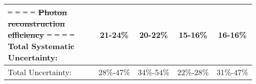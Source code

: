 \documentclass[ALICE,manyauthors]{cernphprep}
\newcommand{\zt}{\ensuremath{z_{\mathrm{T}}}\xspace}
\newcommand{\pPb}          {\mbox{p--Pb}\xspace}
\providecommand{\DIFdeltex}[1]{{\protect\color{red}\sout{#1}}}                      %
\providecommand{\DIFdelFL}[1]{\DIFdel{#1}} %
\providecommand{\DIFdelendFL}{} %
\providecommand{\DIFdel}[1]{\texorpdfstring{\DIFdeltex{#1}}{}} %
\DeclareRobustCommand{\DIFdelendFL}{\DIFOaddendFL \let\includegraphics\DIFOincludegraphics} %
\begin{document}
\begin{table*}
\begin{tabular*}{1.0\textwidth}{@{\extracolsep{\fill}}lcccc@{}}
\DIFdelFL{-- }%
\DIFdelFL{-- }%
\DIFdelFL{-- }%
\DIFdelFL{-- }%
\DIFdelFL{Photon reconstruction efficiency }%
\DIFdelFL{-- }%
\DIFdelFL{-- }%
\DIFdelFL{-- }%
\DIFdelFL{-- }%
\DIFdelendFL %
  \hline
  Total Systematic Uncertainty: & 21-24\% & 20-22\% & 15-16\% & 16-16\% \\
  \hline
  Total Uncertainty: & 28\%-47\% & 34\%-54\% & 22\%-28\% & 31\%-47\% \\
  \hline
  \end{tabular*}
  \label{tab:BigSummarySystematics}
\end{table*}
\FloatBarrier

\end{document}
